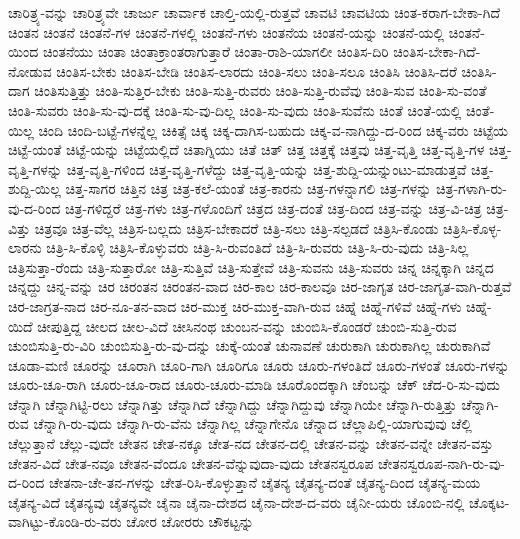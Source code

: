 {ಚಾರಿತ್ರ್ಯ-ವನ್ನು
ಚಾರಿತ್ರ್ಯವೇ
ಚಾರ್ಜು
ಚಾರ್ವಾಕ
ಚಾಲ್ತಿ-ಯಲ್ಲಿ-ರುತ್ತವೆ
ಚಾವಟಿ
ಚಾವಟಿಯ
ಚಿಂತ-ಕರಾಗ-ಬೇಕಾ-ಗಿದೆ
ಚಿಂತನ
ಚಿಂತನೆ
ಚಿಂತನೆ-ಗಳ
ಚಿಂತನೆ-ಗಳಲ್ಲಿ
ಚಿಂತನೆ-ಗಳು
ಚಿಂತನೆಯ
ಚಿಂತನೆ-ಯನ್ನು
ಚಿಂತನೆ-ಯಲ್ಲಿ
ಚಿಂತನೆ-ಯಿಂದ
ಚಿಂತನೆಯು
ಚಿಂತಾ
ಚಿಂತಾಕ್ರಾಂತರಾಗುತ್ತಾರೆ
ಚಿಂತಾ-ರಾಶಿ-ಯಾಗಲೀ
ಚಿಂತಿಸ-ದಿರಿ
ಚಿಂತಿಸ-ಬೇಕಾ-ಗಿದೆ-ನೋಡುವ
ಚಿಂತಿಸ-ಬೇಕು
ಚಿಂತಿಸ-ಬೇಡಿ
ಚಿಂತಿಸ-ಲಾರದು
ಚಿಂತಿ-ಸಲು
ಚಿಂತಿ-ಸಲೂ
ಚಿಂತಿಸಿ
ಚಿಂತಿಸಿ-ದರೆ
ಚಿಂತಿಸಿ-ದಾಗ
ಚಿಂತಿಸುತ್ತಿತ್ತು
ಚಿಂತಿ-ಸುತ್ತಿರ-ಬೇಕು
ಚಿಂತಿ-ಸುತ್ತಿ-ರುವರು
ಚಿಂತಿ-ಸುತ್ತಿ-ರುವೆವು
ಚಿಂತಿ-ಸುವ
ಚಿಂತಿ-ಸು-ವಂತೆ
ಚಿಂತಿ-ಸುವರು
ಚಿಂತಿ-ಸು-ವು-ದಕ್ಕೆ
ಚಿಂತಿ-ಸು-ವು-ದಿಲ್ಲ
ಚಿಂತಿ-ಸು-ವುದು
ಚಿಂತಿ-ಸುವೆನು
ಚಿಂತೆ
ಚಿಂತೆ-ಯಲ್ಲಿ
ಚಿಂತೆ-ಯಿಲ್ಲ
ಚಿಂದಿ
ಚಿಂದಿ-ಬಟ್ಟೆ-ಗಳನ್ನೆಲ್ಲ
ಚಿಕಿತ್ಸೆ
ಚಿಕ್ಕ
ಚಿಕ್ಕ-ದಾಗಿಸ-ಬಹುದು
ಚಿಕ್ಕ-ವ-ನಾಗಿದ್ದು-ದ-ರಿಂದ
ಚಿಕ್ಕ-ವರು
ಚಿಟ್ಟೆಯ
ಚಿಟ್ಟೆ-ಯಂತೆ
ಚಿಟ್ಟೆ-ಯನ್ನು
ಚಿಟ್ಟೆಯಲ್ಲಿದೆ
ಚಿತಾಗ್ನಿಯು
ಚಿತೆ
ಚಿತ್
ಚಿತ್ತ
ಚಿತ್ತಕ್ಕೆ
ಚಿತ್ತವು
ಚಿತ್ತ-ವೃತ್ತಿ
ಚಿತ್ತ-ವೃತ್ತಿ-ಗಳ
ಚಿತ್ತ-ವೃತ್ತಿ-ಗಳನ್ನು
ಚಿತ್ತ-ವೃತ್ತಿ-ಗಳಿಂದ
ಚಿತ್ತ-ವೃತ್ತಿ-ಗಳೆದ್ದು
ಚಿತ್ತ-ವೃತ್ತಿ-ಯನ್ನು
ಚಿತ್ತ-ಶುದ್ದಿ-ಯನ್ನುಂಟು-ಮಾಡುತ್ತವೆ
ಚಿತ್ತ-ಶುದ್ದಿ-ಯಿಲ್ಲ
ಚಿತ್ತ-ಸಾಗರ
ಚಿತ್ತಿನ
ಚಿತ್ರ
ಚಿತ್ರ-ಕಲೆ-ಯಂತೆ
ಚಿತ್ರ-ಕಾರನು
ಚಿತ್ರ-ಗಳನ್ನಾಗಲಿ
ಚಿತ್ರ-ಗಳನ್ನು
ಚಿತ್ರ-ಗಳಾಗಿ-ರು-ವು-ದ-ರಿಂದ
ಚಿತ್ರ-ಗಳಿದ್ದರೆ
ಚಿತ್ರ-ಗಳು
ಚಿತ್ರ-ಗಳೊಂದಿಗೆ
ಚಿತ್ರದ
ಚಿತ್ರ-ದಂತೆ
ಚಿತ್ರ-ದಿಂದ
ಚಿತ್ರ-ವನ್ನು
ಚಿತ್ರ-ವಿ-ಚಿತ್ರ
ಚಿತ್ರ-ವಿತ್ತು
ಚಿತ್ರವೂ
ಚಿತ್ರ-ವೆಲ್ಲ
ಚಿತ್ರಿಸ-ಬಲ್ಲದು
ಚಿತ್ರಿಸ-ಬೇಕಾದರೆ
ಚಿತ್ರಿ-ಸಲು
ಚಿತ್ರಿ-ಸಲ್ಪಡದೆ
ಚಿತ್ರಿಸಿ-ಕೊಂಡು
ಚಿತ್ರಿಸಿ-ಕೊಳ್ಳ-ಲಾರನು
ಚಿತ್ರಿ-ಸಿ-ಕೊಳ್ಳಿ
ಚಿತ್ರಿಸಿ-ಕೊಳ್ಳುವರು
ಚಿತ್ರಿ-ಸಿ-ರುವಂತಿದೆ
ಚಿತ್ರಿ-ಸಿ-ರುವರು
ಚಿತ್ರಿ-ಸಿ-ರು-ವುದು
ಚಿತ್ರಿ-ಸಿಲ್ಲ
ಚಿತ್ರಿಸುತ್ತಾ-ರೆಂದು
ಚಿತ್ರಿ-ಸುತ್ತಾರೋ
ಚಿತ್ರಿ-ಸುತ್ತಿವೆ
ಚಿತ್ರಿ-ಸುತ್ತೇವೆ
ಚಿತ್ರಿ-ಸುವನು
ಚಿತ್ರಿ-ಸುವರು
ಚಿನ್ನ
ಚಿನ್ನಕ್ಕಾಗಿ
ಚಿನ್ನದ
ಚಿನ್ನದ್ದು
ಚಿನ್ನ-ವನ್ನು
ಚಿರ
ಚಿರಂತನ
ಚಿರಂತನ-ವಾದ
ಚಿರ-ಕಾಲ
ಚಿರ-ಕಾಲವೂ
ಚಿರ-ಜಾಗೃತ
ಚಿರ-ಜಾಗೃತ-ವಾಗಿ-ರುತ್ತವೆ
ಚಿರ-ಜಾಗ್ರತ-ನಾದ
ಚಿರ-ನೂ-ತನ-ವಾದ
ಚಿರ-ಮುಕ್ತ
ಚಿರ-ಮುಕ್ತ-ವಾಗಿ-ರುವ
ಚಿಹ್ನೆ
ಚಿಹ್ನೆ-ಗಳಿವೆ
ಚಿಹ್ನೆ-ಗಳು
ಚಿಹ್ನೆ-ಯಿದೆ
ಚೀಪುತ್ತಿದ್ದ
ಚೀಲದ
ಚೀಲ-ವಿದೆ
ಚೀಸಿನಂಥ
ಚುಂಬನ-ವನ್ನು
ಚುಂಬಿಸಿ-ಕೊಂಡರೆ
ಚುಂಬಿ-ಸುತ್ತಿ-ರುವ
ಚುಂಬಿಸುತ್ತಿ-ರು-ವಿರಿ
ಚುಂಬಿಸುತ್ತಿ-ರು-ವು-ದನ್ನು
ಚುಕ್ಕೆ-ಯಂತೆ
ಚುನಾವಣೆ
ಚುರುಕಾಗಿ
ಚುರುಕಾಗಿಲ್ಲ
ಚುರುಕಾಗಿವೆ
ಚೂಡಾ-ಮಣಿ
ಚೂರನ್ನು
ಚೂರಾಗಿ
ಚೂರಿ-ಗಾಗಿ
ಚೂರಿಗೂ
ಚೂರು
ಚೂರು-ಗಳಂತಿದೆ
ಚೂರು-ಗಳಂತೆ
ಚೂರು-ಗಳನ್ನು
ಚೂರು-ಚೂ-ರಾಗಿ
ಚೂರು-ಚೂ-ರಾದ
ಚೂರು-ಚೂರು-ಮಾಡಿ
ಚೂರೊಂದಕ್ಕಾಗಿ
ಚೆಂಬನ್ನು
ಚೆಕ್
ಚೆದ-ರಿ-ಸು-ವುದು
ಚೆನ್ನಾಗಿ
ಚೆನ್ನಾಗಿಟ್ಟಿ-ರಲು
ಚೆನ್ನಾಗಿತ್ತು
ಚೆನ್ನಾಗಿದೆ
ಚೆನ್ನಾಗಿದ್ದು
ಚೆನ್ನಾಗಿದ್ದುವು
ಚೆನ್ನಾಗಿಯೇ
ಚೆನ್ನಾಗಿ-ರುತ್ತಿತ್ತು
ಚೆನ್ನಾಗಿ-ರುವ
ಚೆನ್ನಾಗಿ-ರು-ವುದು
ಚೆನ್ನಾಗಿ-ರು-ವೆನು
ಚೆನ್ನಾಗಿಲ್ಲ
ಚೆನ್ನಾಗೇನೊ
ಚೆನ್ನಾದ
ಚೆಲ್ಲಾಪಿಲ್ಲಿ-ಯಾಗುವುವು
ಚೆಲ್ಲಿ
ಚೆಲ್ಲುತ್ತಾನೆ
ಚೆಲ್ಲು-ವುದೇ
ಚೇತನ
ಚೇತ-ನಕ್ಕೂ
ಚೇತ-ನದ
ಚೇತನ-ದಲ್ಲಿ
ಚೇತನ-ವನ್ನು
ಚೇತನ-ವನ್ನೇ
ಚೇತನ-ವಸ್ತು
ಚೇತನ-ವಿದೆ
ಚೇತ-ನವೂ
ಚೇತನ-ವೆಂದೂ
ಚೇತನ-ವೆನ್ನುವುದಾ-ವುದು
ಚೇತನಸ್ವರೂಪ
ಚೇತನಸ್ವರೂಪ-ನಾಗಿ-ರು-ವು-ದ-ರಿಂದ
ಚೇತನಾ-ಚೇ-ತನ-ಗಳನ್ನು
ಚೇತ-ರಿಸಿ-ಕೊಳ್ಳುತ್ತಾನೆ
ಚೈತನ್ಯ
ಚೈತನ್ಯ-ದಂತೆ
ಚೈತನ್ಯ-ದಿಂದ
ಚೈತನ್ಯ-ಮಯ
ಚೈತನ್ಯ-ವಿದೆ
ಚೈತನ್ಯವು
ಚೈತನ್ಯವೇ
ಚೈನಾ
ಚೈನಾ-ದೇಶದ
ಚೈನಾ-ದೇಶ-ದ-ವರು
ಚೈನೀ-ಯರು
ಚೊಂಬಿ-ನಲ್ಲಿ
ಚೊಕ್ಕಟ-ವಾಗಿಟ್ಟು-ಕೊಂಡಿ-ರು-ವರು
ಚೋರ
ಚೋರರು
ಚೌಕಟ್ಟನ್ನು
}
